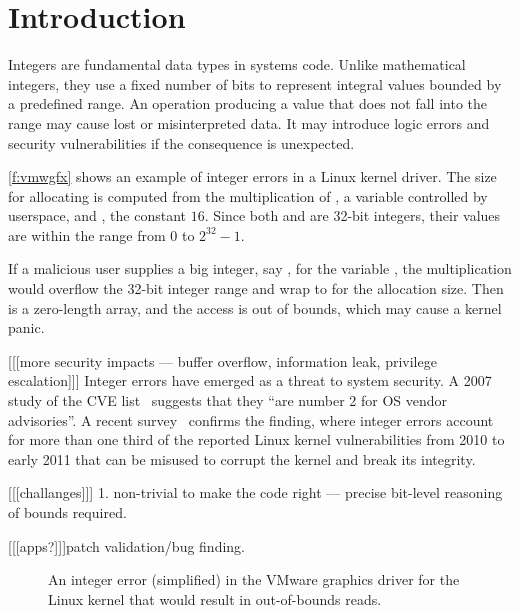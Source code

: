 \section{Introduction}
\label{s:intro}

Integers are fundamental data types in systems code.  Unlike
mathematical integers, they use a fixed number of bits to represent
integral values bounded by a predefined range.  An operation producing
a value that does not fall into the range may cause lost or
misinterpreted data.  It may introduce logic errors and security
vulnerabilities if the consequence is unexpected.

\autoref{f:vmwgfx} shows an example of integer errors in a Linux
kernel driver.  The size for allocating  is computed from
the multiplication of , a variable controlled
by userspace, and , the constant
$16$.  Since both  and  are 32-bit
integers, their values are within the range from 0 to $2^{32} - 1$.

If a malicious user supplies a big integer, say ,
for the variable , the multiplication would
overflow the 32-bit integer range and wrap to  for the allocation size.  Then  is a zero-length
array, and the access  is out of bounds, which may
cause a kernel panic.

[[[more security impacts --- buffer overflow, information leak,
privilege escalation]]]
Integer errors have emerged as a threat to system security.  A 2007
study of the CVE list~\cite{christey:vuln} suggests that they ``are
number 2 for OS vendor advisories''.  A recent survey~\cite{chen:kbugs}
confirms the finding, where integer errors account for more than
one third of the reported Linux kernel vulnerabilities from 2010
to early 2011 that can be misused to corrupt the kernel and break
its integrity.

[[[challanges]]]
1. non-trivial to make the code right
--- precise bit-level reasoning of bounds required.

[[[apps?]]]patch validation/bug finding.

\begin{figure}

\caption{An integer error (simplified) in the VMware graphics driver
for the Linux kernel that would result in out-of-bounds reads.}
\label{f:vmwgfx}
\end{figure}
